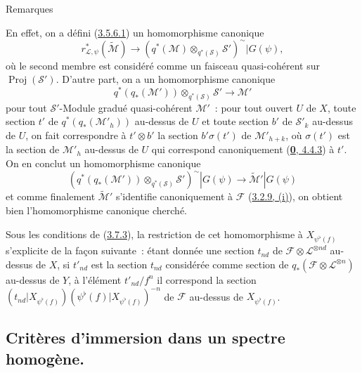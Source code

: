 \begin{namedtheorem}[3.7.9]{Remarques}
\begin{enumerate}
    En effet, on a défini (\hyperref[II.3.5.6.1-fr]{3.5.6.1}) un
    homomorphisme canonique
    \[
    \label{II.3.7.9.3-fr}
      r_{\mathcal{L},\psi}^*(\widetilde{\mathcal{M}})
      \longrightarrow
      (q^*(\mathcal{M})\otimes_{q^*(\mathcal{S})}\mathcal{S}')^{\sim}
      |G(\psi),
    \tag{3.7.9.3}
    \]
    où le second membre est considéré comme un faisceau quasi-cohérent sur
    $\operatorname{Proj}(\mathcal{S}')$. D'autre part, on a un
    homomorphisme canonique
    \[
    \label{II.3.7.9.4-fr}
      q^*(q_*(\mathcal{M}'))\otimes_{q^*(\mathcal{S})}\mathcal{S}'
      \longrightarrow\mathcal{M}'
    \tag{3.7.9.4}
    \]
    pour tout $\mathcal{S}'$-Module gradué quasi-cohérent $\mathcal{M}'$~:
    pour tout ouvert $U$ de $X$, toute section $t'$ de
    $q^*(q_*(\mathcal{M}'_h))$ au-dessus de $U$ et toute section $b'$ de
    $\mathcal{S}'_k$ au-dessus de $U$, on fait correspondre à $t'\otimes b'$ la
    section $b'\sigma(t')$ de $\mathcal{M}'_{h+k}$, où $\sigma(t')$ est la
    section de $\mathcal{M}'_h$ au-dessus de $U$ qui correspond canoniquement
    (\hyperref[0.4.4.3-fr]{\textbf{0}, 4.4.3}) à $t'$. On en conclut un homomorphisme
    canonique
    \[
    \label{II.3.7.9.5-fr}
      (q^*(q_*(\mathcal{M}'))\otimes_{q^*(\mathcal{S})}\mathcal{S}')^{\sim}
      |G(\psi)\longrightarrow\widetilde{\mathcal{M}}'|G(\psi)
    \tag{3.7.9.5}
    \]
    et comme finalement $\widetilde{\mathcal{M}}'$ s'identifie
    canoniquement à $\mathcal{F}$
    (\hyperref[II.3.2.9-fr]{3.2.9, (i)}), on obtient bien l'homomorphisme
    canonique cherché.

    Sous les conditions de (\hyperref[II.3.7.3-fr]{3.7.3}), la restriction
    de cet homomorphisme à $X_{\psi^\flat(f)}$ s'explicite de la façon
    suivante~: étant donnée une section $t_{nd}$ de
    $\mathcal{F}\otimes\mathcal{L}^{\otimes nd}$ au-dessus de $X$, si
    $t'_{nd}$ est la section $t_{nd}$ considérée comme section de
    $q_*(\mathcal{F}\otimes\mathcal{L}^{\otimes n})$ au-dessus de $Y$, à
    l'élément $t'_{nd}/f^n$ il correspond la section
    $(t_{nd}|X_{\psi^\flat(f)})
    (\psi^\flat(f)|X_{\psi^\flat(f)})^{-n}$ de $\mathcal{F}$ au-dessus de
    $X_{\psi^\flat(f)}$.
\end{enumerate}
\end{namedtheorem}


\subsection{Critères d'immersion dans un spectre homogène.}
\label{subsection:II.3.8-fr}

